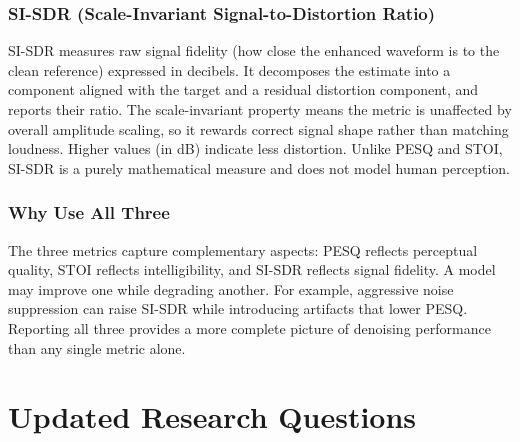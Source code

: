 \documentclass[11pt, letterpaper]{article}
\begin{document}
\subsubsection{SI-SDR (Scale-Invariant Signal-to-Distortion Ratio)}
SI-SDR measures raw signal fidelity (how close the enhanced
waveform is to the clean reference) expressed in decibels. It
decomposes the estimate into a component aligned with the target and a
residual distortion component, and reports their ratio. The
scale-invariant property means the metric is unaffected by overall
amplitude scaling, so it rewards correct signal shape rather
than matching loudness. Higher values (in dB) indicate less
distortion. Unlike PESQ and STOI, SI-SDR is a purely mathematical
measure and does not model human perception.

\subsubsection{Why Use All Three}
The three metrics capture complementary aspects: PESQ reflects
perceptual quality, STOI reflects intelligibility, and SI-SDR reflects
signal fidelity. A model may improve one while degrading another. For
example, aggressive noise suppression can raise SI-SDR while
introducing artifacts that lower PESQ. Reporting all three provides a
more complete picture of denoising performance than any single metric
alone.

\newpage

\section{Updated Research Questions}
\end{document}
